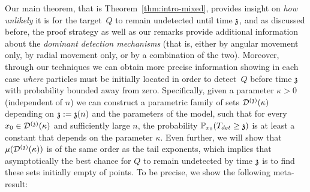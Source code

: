 \medskip 
Our main theorem, that is Theorem~\ref{thm:intro-mixed}, provides insight on \textit{how unlikely} it is for the target~$Q$ to remain undetected until time $\ss$, and as discussed before, the proof strategy as well as our remarks provide additional information about the \textit{dominant detection mechanisms} (that is, either by angular movement only, by radial movement only, or by a combination of the two). Moreover,  through our techniques we can obtain more precise information showing in each case \textit{where} particles must be initially located in order to detect~$Q$ before time $\ss$ with probability bounded away from zero. Specifically, given a parameter $\kappa>0$ (independent of $n$) %
we can construct a parametric family of sets $\dt(\kappa)$ depending on $\ss:=\ss(n)$ and the parameters of the model, such that for every $x_0\in\dt(\kappa)$ and sufficiently large $n$, the probability $\PP_{x_0}(T_{det}\ge\ss)$ is at least a constant that depends on the parameter $\kappa$. Even further, we will show that $\mu(\dt(\kappa))$ is of the same order as the tail exponents, which implies that asymptotically the best chance for $Q$ to remain undetected by time $\ss$ is to find these sets initially empty of points.
To be precise, we show the following meta-result:

